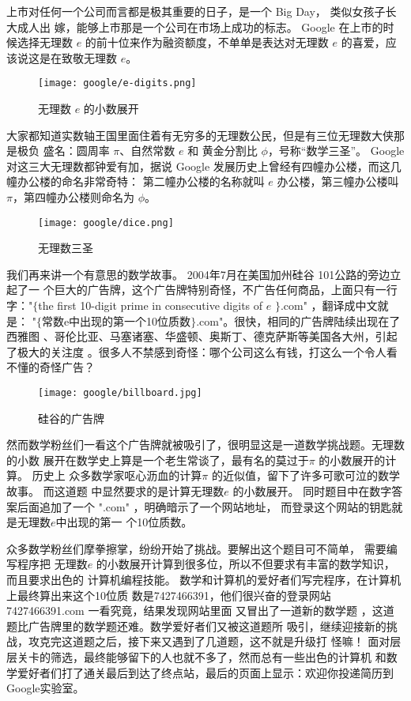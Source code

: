 上市对任何一个公司而言都是极其重要的日子，是一个 Big Day， 类似女孩子长大成人出
嫁，能够上市那是一个公司在市场上成功的标志。 Google 在上市的时候选择无理数 $e$
的前十位来作为融资额度，不单单是表达对无理数 $e$ 的喜爱，应该说这是在致敬无理数
$e$。

\begin{figure}[htbp]
\centering
\texttt{[image: google/e-digits.png]}
\caption{无理数 $e$ 的小数展开}
\centering
\end{figure}
大家都知道实数轴王国里面住着有无穷多的无理数公民，但是有三位无理数大侠那是极负
盛名：圆周率 $\pi$、自然常数 $e$ 和 黄金分割比 $\phi$，号称“数学三圣”。
Google 对这三大无理数都钟爱有加，据说 Google 发展历史上曾经有四幢办公楼，而这几
幢办公楼的命名非常奇特： 第二幢办公楼的名称就叫 $e$ 办公楼，第三幢办公楼叫
$\pi$，第四幢办公楼则命名为 $\phi$。

\begin{figure}[htbp]
\centering
\texttt{[image: google/dice.png]}
\caption{无理数三圣}
\centering
\end{figure}

我们再来讲一个有意思的数学故事。 2004年7月在美国加州硅谷 101公路的旁边立起了一
个巨大的广告牌，这个广告牌特别奇怪，不广告任何商品，上面只有一行字："$\{$the
first 10-digit prime in consecutive digits of $e$ $\}$.com" ，翻译成中文就是：
"$\{$常数e中出现的第一个10位质数$\}$.com"。很快，相同的广告牌陆续出现在了西雅图
、哥伦比亚、马塞诸塞、华盛顿、奥斯丁、德克萨斯等美国各大州，引起了极大的关注度
。很多人不禁感到奇怪：哪个公司这么有钱，打这么一个令人看不懂的奇怪广告？

\begin{figure}[htbp]
\centering
\texttt{[image: google/billboard.jpg]}
\caption{硅谷的广告牌}
\centering
\end{figure}

然而数学粉丝们一看这个广告牌就被吸引了，很明显这是一道数学挑战题。无理数的小数
展开在数学史上算是一个老生常谈了，最有名的莫过于$\pi$ 的小数展开的计算。 历史上
众多数学家呕心沥血的计算$\pi$ 的近似值，留下了许多可歌可泣的数学故事。 而这道题
中显然要求的是计算无理数$e$ 的小数展开。 同时题目中在数字答案后面追加了一个
".com" ，明确暗示了一个网站地址， 而登录这个网站的钥匙就是无理数$e$中出现的第一
个10位质数。

众多数学粉丝们摩拳擦掌，纷纷开始了挑战。要解出这个题目可不简单， 需要编写程序把
无理数$e$ 的小数展开计算到很多位，所以不但要求有丰富的数学知识，而且要求出色的
计算机编程技能。 数学和计算机的爱好者们写完程序，在计算机上最终算出来这个10位质
数是7427466391，他们很兴奋的登录网站 7427466391.com 一看究竟，结果发现网站里面
又冒出了一道新的数学题 ，这道题比广告牌里的数学题还难。数学爱好者们又被这道题所
吸引，继续迎接新的挑战，攻克完这道题之后，接下来又遇到了几道题，这不就是升级打
怪嘛！ 面对层层关卡的筛选，最终能够留下的人也就不多了，然而总有一些出色的计算机
和数学爱好者们打了通关最后到达了终点站，最后的页面上显示：欢迎你投递简历到
Google实验室。

